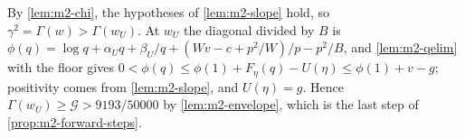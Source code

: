  By \cref{lem:m2-chi}, the hypotheses of \cref{lem:m2-slope} hold, so
$\gamma^2=\Gamma(w)>\Gamma(w_U)$. At $w_U$ the diagonal divided by $B$ is
$\phi(q)=\log q+\alpha_Uq+\beta_U/q+(Wv-c+p^2/W)/p-p^2/B$, and \cref{lem:m2-qelim} with the floor
gives $0<\phi(q)\le\phi(1)+F_\eta(q)-U(\eta)\le\phi(1)+v-g$; positivity comes from
\cref{lem:m2-slope}, and $U(\eta)=g$. Hence $\Gamma(w_U)\ge\mathcal G>9193/50000$ by
\cref{lem:m2-envelope}, which is the last step of \cref{prop:m2-forward-steps}.
